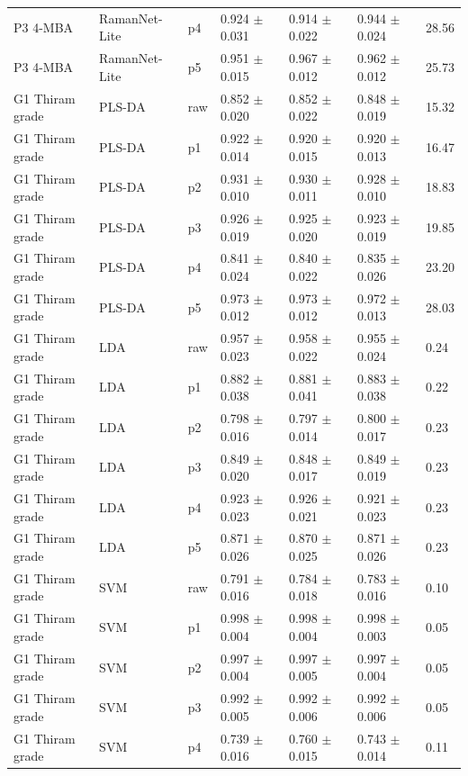 {\begin{longtable}{L{2.35cm}L{2.4cm}L{1.0cm}L{2.35cm}L{2.25cm}L{2.25cm}L{1.45cm}}
P3 4-MBA & RamanNet-Lite & p4 & 0.924 $\pm$ 0.031 & 0.914 $\pm$ 0.022 & 0.944 $\pm$ 0.024 & 28.56 \\
P3 4-MBA & RamanNet-Lite & p5 & 0.951 $\pm$ 0.015 & 0.967 $\pm$ 0.012 & 0.962 $\pm$ 0.012 & 25.73 \\
G1 Thiram grade & PLS-DA & raw & 0.852 $\pm$ 0.020 & 0.852 $\pm$ 0.022 & 0.848 $\pm$ 0.019 & 15.32 \\
G1 Thiram grade & PLS-DA & p1 & 0.922 $\pm$ 0.014 & 0.920 $\pm$ 0.015 & 0.920 $\pm$ 0.013 & 16.47 \\
G1 Thiram grade & PLS-DA & p2 & 0.931 $\pm$ 0.010 & 0.930 $\pm$ 0.011 & 0.928 $\pm$ 0.010 & 18.83 \\
G1 Thiram grade & PLS-DA & p3 & 0.926 $\pm$ 0.019 & 0.925 $\pm$ 0.020 & 0.923 $\pm$ 0.019 & 19.85 \\
G1 Thiram grade & PLS-DA & p4 & 0.841 $\pm$ 0.024 & 0.840 $\pm$ 0.022 & 0.835 $\pm$ 0.026 & 23.20 \\
G1 Thiram grade & PLS-DA & p5 & 0.973 $\pm$ 0.012 & 0.973 $\pm$ 0.012 & 0.972 $\pm$ 0.013 & 28.03 \\
G1 Thiram grade & LDA & raw & 0.957 $\pm$ 0.023 & 0.958 $\pm$ 0.022 & 0.955 $\pm$ 0.024 & 0.24 \\
G1 Thiram grade & LDA & p1 & 0.882 $\pm$ 0.038 & 0.881 $\pm$ 0.041 & 0.883 $\pm$ 0.038 & 0.22 \\
G1 Thiram grade & LDA & p2 & 0.798 $\pm$ 0.016 & 0.797 $\pm$ 0.014 & 0.800 $\pm$ 0.017 & 0.23 \\
G1 Thiram grade & LDA & p3 & 0.849 $\pm$ 0.020 & 0.848 $\pm$ 0.017 & 0.849 $\pm$ 0.019 & 0.23 \\
G1 Thiram grade & LDA & p4 & 0.923 $\pm$ 0.023 & 0.926 $\pm$ 0.021 & 0.921 $\pm$ 0.023 & 0.23 \\
G1 Thiram grade & LDA & p5 & 0.871 $\pm$ 0.026 & 0.870 $\pm$ 0.025 & 0.871 $\pm$ 0.026 & 0.23 \\
G1 Thiram grade & SVM & raw & 0.791 $\pm$ 0.016 & 0.784 $\pm$ 0.018 & 0.783 $\pm$ 0.016 & 0.10 \\
G1 Thiram grade & SVM & p1 & 0.998 $\pm$ 0.004 & 0.998 $\pm$ 0.004 & 0.998 $\pm$ 0.003 & 0.05 \\
G1 Thiram grade & SVM & p2 & 0.997 $\pm$ 0.004 & 0.997 $\pm$ 0.005 & 0.997 $\pm$ 0.004 & 0.05 \\
G1 Thiram grade & SVM & p3 & 0.992 $\pm$ 0.005 & 0.992 $\pm$ 0.006 & 0.992 $\pm$ 0.006 & 0.05 \\
G1 Thiram grade & SVM & p4 & 0.739 $\pm$ 0.016 & 0.760 $\pm$ 0.015 & 0.743 $\pm$ 0.014 & 0.11 \\

\end{longtable}}
